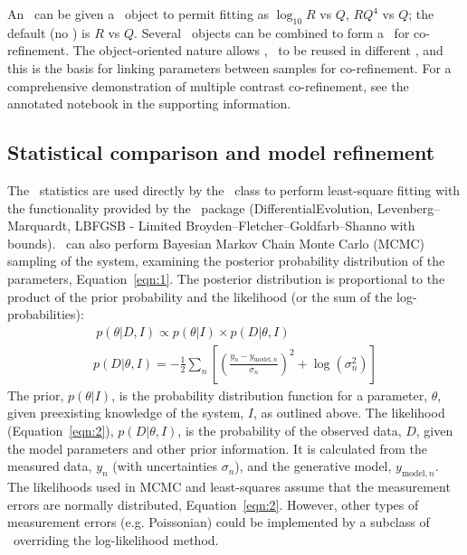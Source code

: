 \documentclass[pdf,preprint]{iucr}
\begin{document}
An \Objective\ can be given a \Transform\ object to permit fitting as $\log_{10} R$ vs $Q$, $RQ^4$ vs $Q$; the default (no \Transform) is $R$ vs $Q$. Several \Objective\ objects can be combined to form a \GlobalObjective\ for co-refinement. The object-oriented nature allows \Parameter, \Component\ to be reused in different \Objective, and this is the basis for linking parameters between samples for co-refinement. For a comprehensive demonstration of multiple contrast co-refinement, see the annotated notebook in the supporting information.

\subsection{Statistical comparison and model refinement}

The \Objective\ statistics are used directly by the \CurveFitter\ class to perform least-square fitting with the functionality provided by the \SciPy\ package (DifferentialEvolution, Levenberg--Marquardt, LBFGSB - Limited Broyden--Fletcher--Goldfarb--Shanno with bounds).
\CurveFitter\ can also perform Bayesian Markov Chain Monte Carlo (MCMC) sampling of the system, examining the posterior probability distribution of the parameters, Equation~\ref{eqn:1}. The posterior distribution is proportional to the product of the prior probability and the likelihood (or the sum of the log-probabilities):
%
\begin{gather} 
\label{eqn:1}\ p(\theta | D, I) \propto p(\theta | I)\times p(D | \theta, I)\\
p(D | \theta, I) = -\frac{1}{2} \sum_n \left[\left(\frac{y_n - y_{\mathrm{model},n}} {\sigma_n}\right)^2 + \log(\sigma_n^2)\right]\label{eqn:2}
\end{gather}
%
The prior, $p(\theta | I)$, is the probability distribution function for a parameter, $\theta$, given preexisting knowledge of the system, $I$, as outlined above.
The likelihood (Equation~\ref{eqn:2}), $p(D | \theta, I)$, is the probability of the observed data, $D$, given the model parameters and other prior information. It is calculated from the measured data, $y_n$ (with uncertainties $\sigma_n$), and the generative model, $y_{\mathrm{model},n}$. The likelihoods used in MCMC and least-squares assume that the measurement errors are normally distributed, Equation~\ref{eqn:2}. However, other types of measurement errors (e.g. Poissonian) could be implemented by a subclass of \Objective\ overriding the log-likelihood method.
\end{document}
